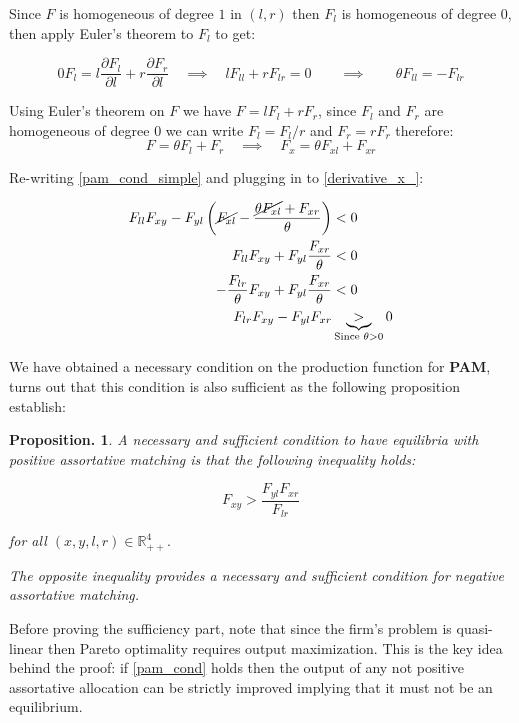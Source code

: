 \documentclass[12pt]{article}
\newtheorem{prop}{Proposition. }
\theoremstyle{definition}
\newcommand{\qiq}{\qquad \implies \qquad}
\begin{document}
Since $F$ is homogeneous of degree $1$ in $(l,r)$ then $F_l$ is homogeneous of degree $0$, then apply Euler's theorem to $F_l$ to get:

\begin{equation}
0F_l = l \frac{\partial F_l}{\partial l} + r\frac{\partial F_r}{\partial l} \quad \implies \quad  lF_{ll} + rF_{lr} = 0 \qiq \theta F_{ll} = -F_{lr} \label{derivative_ll_lr}
\end{equation}


Using Euler's theorem on $F$ we have $F = l F_l + r F_r $, since $F_l$ and $F_r$ are homogeneous of degree $0$ we can write $F_l = F_l/r$ and $F_r = rF_r$ therefore:
\begin{equation}
F = \theta F_l + F_r \quad \implies \quad F_x = \theta F_{xl} + F_{xr} \label{derivative_x_}
\end{equation}


Re-writing \eqref{pam_cond_simple} and plugging in to \eqref{derivative_x_}:

\begin{align*}
F_{l l}F_{x y} - F_{y l}\left(\cancel{F_{x l}}-\frac{\cancel{\theta F_{xl}} + F_{xr}}{\theta}\right) & < 0 \\
F_{ll}F_{xy}+F_{yl} \frac{F_{xr}}{\theta}& < 0 \\
-\frac{F_{lr}}{\theta}F_{xy}+F_{yl} \frac{F_{xr}}{\theta}& < 0 \\
F_{lr}F_{xy}-F_{yl}F_{xr}& \underbrace{>}_{\text{Since }\theta>0} 0
\end{align*}

We have obtained a necessary condition on the production function for \textbf{PAM}, turns out that this condition is also sufficient as the following proposition establish:

\begin{prop}\label{prop2}
 A necessary and sufficient condition to have equilibria with positive assortative matching is that the following inequality holds:

\begin{equation}\label{pam_cond}
    F_{x y} > \frac{F_{y l} F_{x r}}{F_{l r}}    
\end{equation}

for all $(x, y, l, r) \in \mathbb{R}_{++}^{4} .$ 

The opposite inequality provides a necessary and sufficient condition for negative assortative matching.
\end{prop}

Before proving the sufficiency part, note that since the firm's problem is quasi-linear then Pareto optimality requires output maximization. This is the key idea behind the proof: if \eqref{pam_cond} holds then the output of any not positive assortative allocation can be strictly improved implying that it must not be an equilibrium.
\end{document}
